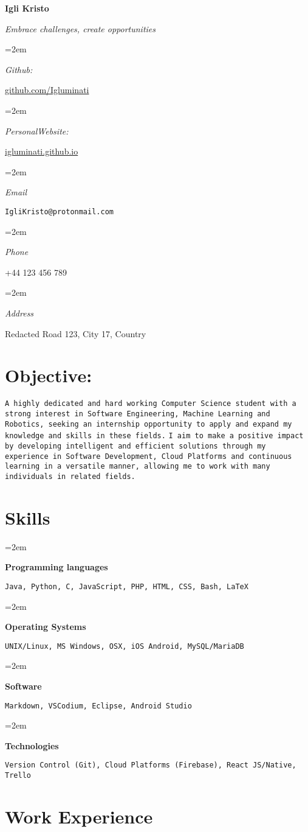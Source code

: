 \documentclass[11pt]{article} %
\newlength{\spacebox}
\newcommand{\sepspace}{\vspace*{1em}}
\newcommand{\name}[1] {
	
	\Huge %
	
	\fontfamily{phv}\selectfont %
	
	
	\begin{center} \textbf{#1} \end{center}\par
	
	
	\normalsize\normalfont
	
}
\newcommand{\motto}[1]{ 
	
	\large %
	
	\fontfamily{phv}\selectfont %
	
	
	\begin{center} \textsl{#1}\end{center}\par
	
	
	\normalsize \normalfont
	
}
\newcommand{\info}[2]{  
	
	
	\noindent\hangindent=2em\hangafter=0 
	
	
	\parbox{\spacebox}{%
		
		\textsl{#1}} %
	
	#2 \par} %
\newcommand{\skill}[2]{ 
	
	
	\noindent\hangindent=2em\hangafter=0
	
	
	\parbox{3\spacebox}{%
		
		\textbf{#1}} %
	
	#2 \par} %
\begin{document}
	
	\name{Igli Kristo} 
	
	\vspace*{-10pt} 
	
	\motto{Embrace challenges, create opportunities}
	
	
	\info{Github:}{\href{https://github.com/Igluminati}{github.com/Igluminati}}
	\info{PersonalWebsite:}{\href{https://igluminati.github.io}{igluminati.github.io}}
	\info{Email}{\texttt{IgliKristo@protonmail.com}} 	
	\info{Phone}{+44 123 456 789} 
	\info{Address}{Redacted Road 123, City 17, Country}
	
	
	\section*{Objective:}
	
	\texttt{A highly dedicated and hard working Computer Science student with a strong interest
	in Software Engineering, Machine Learning and Robotics, seeking an internship opportunity to
	apply and expand my knowledge and skills in these fields.}
	\texttt{I aim to make a positive impact by developing intelligent and efficient solutions
		through my experience in Software Development, Cloud Platforms and continuous learning
		 in a versatile manner, allowing me to work with many individuals in related fields.}
	
	
	\section*{Skills}
	
	\skill{Programming languages}{\texttt{Java, Python, C, JavaScript, PHP, HTML, CSS, Bash, \LaTeX}}
	\skill{Operating Systems}{\texttt{UNIX/Linux, MS Windows, OSX, iOS Android, MySQL/MariaDB}}
	\skill{Software}{\texttt{Markdown, VSCodium, Eclipse, Android Studio}} 
	\skill{Technologies}{\texttt{Version Control (Git), Cloud Platforms (Firebase), React JS/Native, Trello}}
	
	
	\section*{Work Experience}
	
	\sepspace
	
\end{document}
